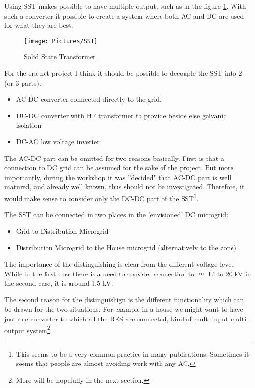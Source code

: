 \documentclass[]{scrartcl}
\begin{document}
Using SST makes possible to have multiple output, such as in the figure \ref{fig:SST}. With such a converter it possible to create a  system where both AC and DC are used for what they are best. 
\begin{figure}[h!]
	\centering
	\texttt{[image: Pictures/SST]}
	\caption{Solid State Transformer}
	\label{fig:SST}
\end{figure}


For the era-net project I think it should be possible to decouple the SST into 2 (or 3 parts).
\begin{itemize}
	\item  AC-DC converter connected directly to the grid. 
	\item DC-DC converter with HF transformer to provide beside else galvanic isolation
	\item DC-AC low voltage inverter
\end{itemize}

The AC-DC part can be omitted for two reasons basically. First is that a connection to DC grid can be assumed for the sake of the project. But more importantly, during the workshop it was ''decided" that AC-DC part is well matured, and already well known, thus should not be investigated. Therefore, it would make sense to consider only the DC-DC part of the SST\footnote{This seems to be a very common practice in many publications. Sometimes it seems that people are almost avoiding work with any AC.}. 

The SST can be connected in two places in the 'envisioned' DC microgrid:
\begin{itemize}
	\item Grid to Distribution Microgrid
	\item Distribution Microgrid to the House microgrid (alternatively to the zone)
\end{itemize}

The importance of the distinguishing is clear from the different voltage level. While in the first case there is a need to consider connection to $\approxeq$ 12 to 20 kV in the second case, it is around 1.5 kV. 

The second reason for the distinguishign is the different functionality which can be drawn for the two situations. For example in a house we might want to have just one converter to which all the RES are connected, kind of multi-input-multi-output system\footnote{More will be hopefully in the next section.}.
\end{document}
